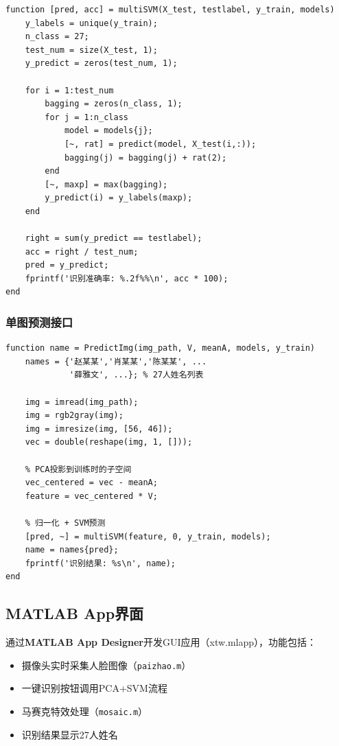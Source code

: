 \documentclass[12pt,a4paper]{ctexart}
\begin{document}
\begin{lstlisting}[style=matlabstyle, caption={multiSVM.m -- Bagging后验概率投票}]
function [pred, acc] = multiSVM(X_test, testlabel, y_train, models)
    y_labels = unique(y_train);
    n_class = 27;
    test_num = size(X_test, 1);
    y_predict = zeros(test_num, 1);

    for i = 1:test_num
        bagging = zeros(n_class, 1);
        for j = 1:n_class
            model = models{j};
            [~, rat] = predict(model, X_test(i,:));
            bagging(j) = bagging(j) + rat(2);
        end
        [~, maxp] = max(bagging);
        y_predict(i) = y_labels(maxp);
    end

    right = sum(y_predict == testlabel);
    acc = right / test_num;
    pred = y_predict;
    fprintf('识别准确率: %.2f%%\n', acc * 100);
end
\end{lstlisting}

\subsubsection{单图预测接口}

\begin{lstlisting}[style=matlabstyle, caption={PredictImg.m -- 新图像预测}]
function name = PredictImg(img_path, V, meanA, models, y_train)
    names = {'赵某某','肖某某','陈某某', ...
             '薛雅文', ...}; % 27人姓名列表

    img = imread(img_path);
    img = rgb2gray(img);
    img = imresize(img, [56, 46]);
    vec = double(reshape(img, 1, []));

    % PCA投影到训练时的子空间
    vec_centered = vec - meanA;
    feature = vec_centered * V;

    % 归一化 + SVM预测
    [pred, ~] = multiSVM(feature, 0, y_train, models);
    name = names{pred};
    fprintf('识别结果: %s\n', name);
end
\end{lstlisting}

\subsection{MATLAB App界面}

通过\textbf{MATLAB App Designer}开发GUI应用（xtw.mlapp），功能包括：
\begin{itemize}
    \item 摄像头实时采集人脸图像（\texttt{paizhao.m}）
    \item 一键识别按钮调用PCA+SVM流程
    \item 马赛克特效处理（\texttt{mosaic.m}）
    \item 识别结果显示27人姓名
\end{itemize}
\end{document}
